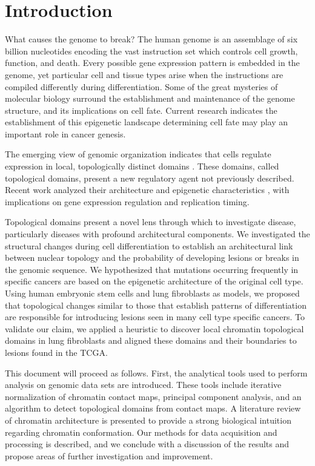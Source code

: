 
\chapter{Introduction}

What causes the genome to break?  The human genome is an assemblage of six billion nucleotides encoding the vast instruction set
which controls cell growth, function, and death.  Every possible gene expression pattern is embedded in the genome, yet particular
cell and tissue types arise when the instructions are compiled differently during differentiation.  Some of the great mysteries
of molecular biology surround the establishment and maintenance of the genome structure, and its implications on cell fate. 
Current research indicates the establishment of this \gls{epigenetic} landscape determining cell fate may play an important
role in cancer genesis.

The emerging view of genomic organization indicates that cells regulate expression in local, topologically distinct domains
\citep{guelen2008,dixon2012,pope2014}.  These domains, called topological domains, present a new regulatory agent not
previously described.  Recent work analyzed their architecture \citep{imakaev2012} and epigenetic characteristics
\citep{dixon2012, pope2014}, with implications on gene expression regulation and replication timing.

Topological domains present a novel lens through which to investigate disease, particularly diseases with profound architectural components.
We investigated the structural changes during cell differentiation to establish an architectural link between
nuclear topology and the probability of developing lesions or breaks in the genomic sequence.  We hypothesized that mutations
occurring frequently in specific cancers are based on the epigenetic architecture of the original cell type.  Using human
embryonic stem cells and lung fibroblasts as models, we proposed that topological changes similar to those that establish
patterns of differentiation are responsible for introducing lesions seen in many cell type specific cancers.  To validate our
claim, we applied a heuristic to discover local chromatin topological domains in lung fibroblasts and aligned these domains and
their boundaries to lesions found in the \gls{TCGA}.

This document will proceed as follows.  First, the analytical tools used to perform analysis on genomic data sets are introduced.
These tools include iterative normalization of chromatin contact maps, principal component analysis, and an algorithm to detect
topological domains from contact maps.  A literature review of chromatin architecture is presented to
provide a strong biological intuition regarding chromatin conformation.  Our methods for data acquisition and processing is
described, and we conclude with a discussion of the results and propose areas of further investigation and improvement.

